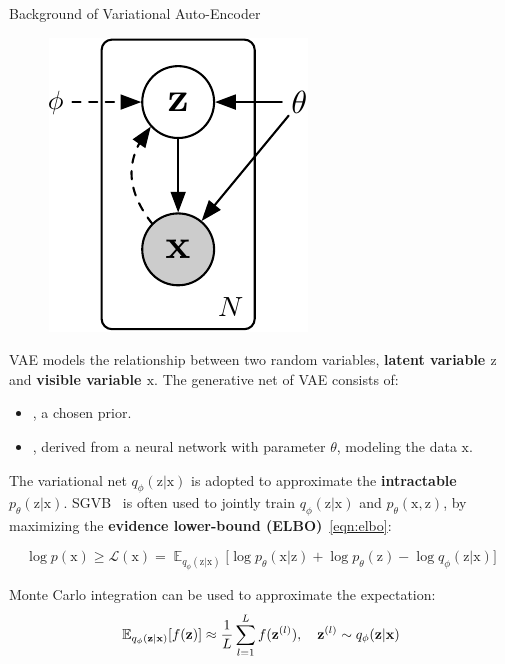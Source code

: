 \documentclass[usenames,dvipsnames]{beamer}
\newcommand{\emphasis}[1]{\textbf{\textcolor{emphcolor}{#1}}}
\let\originalleft\left
\let\originalright\right
\newcommand{\mleft}{\mathopen{}\mathclose\bgroup\originalleft}
\newcommand{\mright}{\aftergroup\egroup\originalright}
\newcommand{\vv}[1]{\bm{\mathrm{{#1}}}}
\newcommand{\E}{\operatorname{\mathbb{E}}}
\newcommand{\EEE}[2]{\operatorname{\mathbb{E}}_{{#1}}\mleft[{#2}\mright]}
\begin{document}
\begin{frame}{Background of Variational Auto-Encoder}

  \begin{minipage}[t]{0.25\linewidth}
    \begin{figure}
      \includegraphics[height=.33\textheight]{variational-auto-encoder}
    \end{figure}
  \end{minipage}\hfill%
  \begin{minipage}[t]{0.74\linewidth}
    VAE models the relationship between two random variables, \emphasis{latent variable $\vv{z}$} and \emphasis{visible variable $\vv{x}$}.  The generative net of VAE consists of:
    \begin{itemize}\setlength\itemsep{0em}
      \item \structure{$\vv{z} \sim p_{\theta}(\vv{z})$}, a chosen prior.
      \item \structure{$\vv{x} \sim p_{\theta}(\vv{x}|\vv{z})$}, derived from a neural network with parameter $\theta$, modeling the data $\vv{x}$.
    \end{itemize}
    The variational net \emphasis{$q_{\phi}(\vv{z}|\vv{x})$} is adopted to approximate the \emphasis{intractable $p_{\theta}(\vv{z}|\vv{x})$}.
    SGVB~\citep{kingma_auto-encoding_2014} is often used to jointly train $q_{\phi}(\vv{z}|\vv{x})$ and $p_{\theta}(\vv{x},\vv{z})$, by maximizing the \emphasis{evidence lower-bound (ELBO)}~\eqref{eqn:elbo}:
  \end{minipage}

  \begin{equation}
    \log p(\vv{x}) \geq \mathcal{L}(\vv{x})
        = \E_{q_{\phi}(\vv{z}|\vv{x})}\Big[\log p_{\theta}(\vv{x}|\vv{z}) + \log p_{\theta}(\vv{z}) - \log q_{\phi}(\vv{z}|\vv{x})\Big]\label{eqn:elbo}
  \end{equation}
  
  Monte Carlo integration can be used to approximate the expectation:
  \[
  \EEE{q_{\phi}(\vv{z}|\vv{x})}{f(\vv{z})} \approx \frac{1}{L} \sum_{l=1}^L f(\vv{z}^{(l)}), \quad \vv{z}^{(l)}\sim q_{\phi}(\vv{z}|\vv{x})
  \]

\end{frame}
\end{document}
